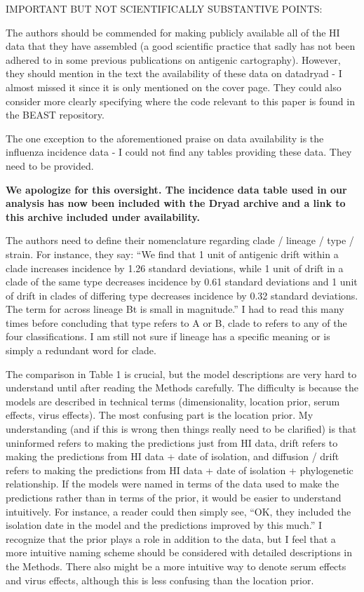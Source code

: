 \documentclass[11pt,oneside,letterpaper]{article}
\begin{document}
IMPORTANT BUT NOT SCIENTIFICALLY SUBSTANTIVE POINTS: 

The authors should be commended for making publicly available all of the HI data that they have assembled (a good scientific practice that sadly has not been adhered to in some previous publications on antigenic cartography). However, they should mention in the text the availability of these data on datadryad - I almost missed it since it is only mentioned on the cover page. They could also consider more clearly specifying where the code relevant to this paper is found in the BEAST repository.

The one exception to the aforementioned praise on data availability is the influenza incidence data - I could not find any tables providing these data. They need to be provided.

\textbf{We apologize for this oversight.  The incidence data table used in our analysis has now been included with the Dryad archive and a link to this archive included under availability.}

The authors need to define their nomenclature regarding clade / lineage / type / strain. For instance, they say: ``We find that 1 unit of antigenic drift within a clade increases incidence by 1.26 standard deviations, while 1 unit of drift in a clade of the same type decreases incidence by 0.61 standard deviations and 1 unit of drift in clades of differing type decreases incidence by 0.32 standard deviations. The term for across lineage Bt is small in magnitude.'' I had to read this many times before concluding that type refers to A or B, clade to refers to any of the four classifications. I am still not sure if lineage has a specific meaning or is simply a redundant word for clade.

The comparison in Table 1 is crucial, but the model descriptions are very hard to understand until after reading the Methods carefully. The difficulty is because the models are described in technical terms (dimensionality, location prior, serum effects, virus effects). The most confusing part is the location prior. My understanding (and if this is wrong then things really need to be clarified) is that uninformed refers to making the predictions just from HI data, drift refers to making the predictions from HI data + date of isolation, and diffusion / drift refers to making the predictions from HI data + date of isolation + phylogenetic relationship. If the models were named in terms of the data used to make the predictions rather than in terms of the prior, it would be easier to understand intuitively. For instance, a reader could then simply see, ``OK, they included the isolation date in the model and the predictions improved by this much.'' I recognize that the prior plays a role in addition to the data, but I feel that a more intuitive naming scheme should be considered with detailed descriptions in the Methods. There also might be a more intuitive way to denote serum effects and virus effects, although this is less confusing than the location prior.
\end{document}
